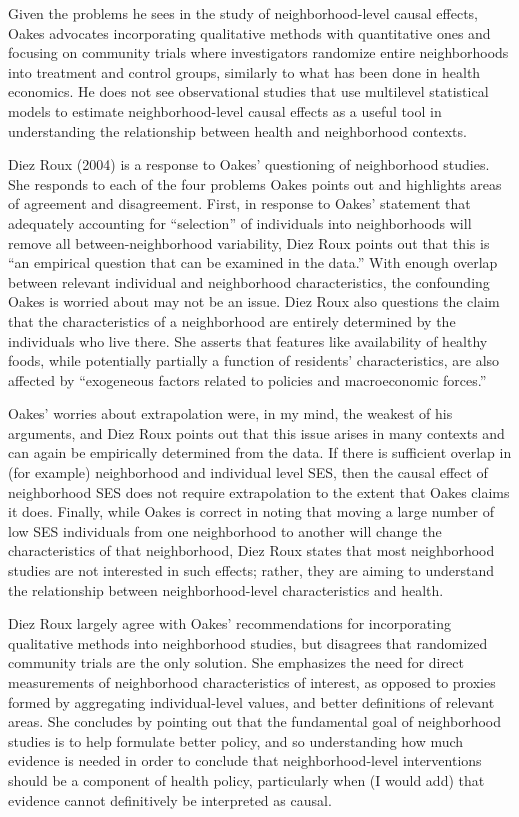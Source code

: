 \documentclass[10pt,a4paper]{article}
\begin{document}
Given the problems he sees in the study of neighborhood-level causal effects, Oakes advocates incorporating qualitative methods with quantitative ones and focusing on community trials where investigators randomize entire neighborhoods into treatment and control groups, similarly to what has been done in health economics. He does not see observational studies that use multilevel statistical models to estimate neighborhood-level causal effects as a useful tool in understanding the relationship between health and neighborhood contexts.

Diez Roux (2004) is a response to Oakes' questioning of neighborhood studies. She responds to each of the four problems Oakes points out and highlights areas of agreement and disagreement. First, in response to Oakes' statement that adequately accounting for ``selection'' of individuals into neighborhoods will remove all between-neighborhood variability, Diez Roux points out that this is ``an empirical question that can be examined in the data.'' With enough overlap between relevant individual and neighborhood characteristics, the confounding Oakes is worried about may not be an issue. Diez Roux also questions the claim that the characteristics of a neighborhood are entirely determined by the individuals who live there. She asserts that features like availability of healthy foods, while potentially partially a function of residents' characteristics, are also affected by ``exogeneous factors related to policies and macroeconomic forces.''

Oakes' worries about extrapolation were, in my mind, the weakest of his arguments, and Diez Roux points out that this issue arises in many contexts and can again be empirically determined from the data. If there is sufficient overlap in (for example) neighborhood and individual level SES, then the causal effect of neighborhood SES does not require extrapolation to the extent that Oakes claims it does. Finally, while Oakes is correct in noting that moving a large number of low SES individuals from one neighborhood to another will change the characteristics of that neighborhood, Diez Roux states that most neighborhood studies are not interested in such effects; rather, they are aiming to understand the relationship between neighborhood-level characteristics and health.

Diez Roux largely agree with Oakes' recommendations for incorporating qualitative methods into neighborhood studies, but disagrees that randomized community trials are the only solution. She emphasizes the need for direct measurements of neighborhood characteristics of interest, as opposed to proxies formed by aggregating individual-level values, and better definitions of relevant areas. She concludes by pointing out that the fundamental goal of neighborhood studies is to help formulate better policy, and so understanding how much evidence is needed in order to conclude that neighborhood-level interventions should be a component of health policy, particularly when (I would add) that evidence cannot definitively be interpreted as causal.
\end{document}
